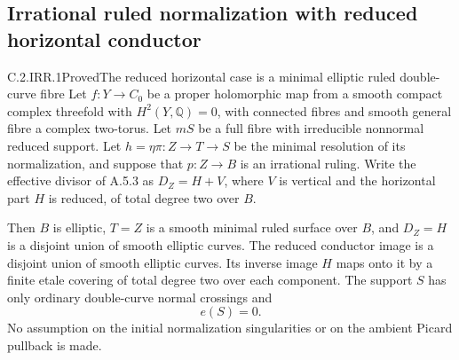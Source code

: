 \subsection{Irrational ruled normalization with reduced horizontal conductor}

\begin{statement}{C.2.IRR.1}{Proved}{The reduced horizontal case is a minimal elliptic ruled double-curve fibre}
Let $f:Y\to C_0$ be a proper holomorphic map from a smooth compact
complex threefold with $H^2(Y,\mathbb Q)=0$, with connected fibres
and smooth general fibre a complex two-torus. Let $mS$ be a full
fibre with irreducible nonnormal reduced support. Let
$h=\eta\pi:Z\to T\to S$ be the minimal resolution of its
normalization, and suppose that $p:Z\to B$ is an irrational
ruling. Write the effective divisor of A.5.3 as
$D_Z=H+V$, where $V$ is vertical and the horizontal part $H$
is reduced, of total degree two over $B$.

Then $B$ is elliptic, $T=Z$ is a smooth minimal ruled surface
over $B$, and $D_Z=H$ is a disjoint union of smooth elliptic
curves. The reduced conductor image is a disjoint union of
smooth elliptic curves. Its inverse image $H$ maps onto it
by a finite etale covering of total degree two over each
component. The support $S$ has only ordinary double-curve
normal crossings and
\[
                         e(S)=0.                 \tag{C.IR.1}
\]
No assumption on the initial normalization singularities or
on the ambient Picard pullback is made.
\end{statement}
